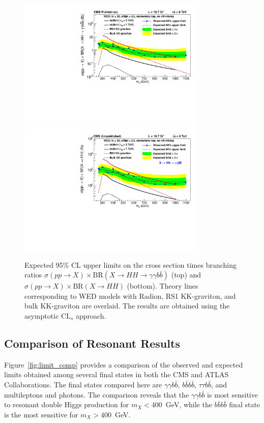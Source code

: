 \begin{figure}[htbp!]
 \begin{center}
   \includegraphics[width=0.8\textwidth]{figures/results/WP4_cutbased_all.pdf}
   \includegraphics[width=0.8\textwidth]{figures/results/WP4_cutbased_HH.pdf}
 \end{center}
\caption{Expected 95\% CL upper limits on the cross section times branching ratios
$\sigma(pp\rightarrow X) \times \text{BR}( X \rightarrow HH \rightarrow \gamma\gamma b\bar{b})$ (top)
and $\sigma(pp\rightarrow X) \times \text{BR}( X \rightarrow HH )$ (bottom).
Theory lines corresponding to WED models with Radion, RS1 KK-graviton, and bulk KK-graviton are
overlaid. The results are obtained using the asymptotic $\text{CL}_s$ approach.}
\label{fig:limits_allres}
\end{figure}

\subsection{Comparison of Resonant Results}

Figure~\ref{fig:limit_comp} provides a comparison of the observed and expected limits obtained
among several final states in both the CMS and ATLAS Collaborations. The final states compared here
are $\gamma \gamma b\bar{b}$, $b\bar{b}b\bar{b}$, $\tau\tau b\bar{b}$, and multileptons and photons.
The comparison reveals that the $\gamma \gamma b\bar{b}$ is most sensitive to resonant double
Higgs production for $m_X < 400$~GeV, while the $b\bar{b}b\bar{b}$ final state is the most sensitive
for $m_X > 400$~GeV.


